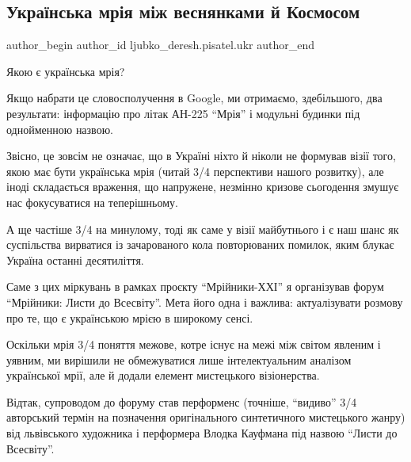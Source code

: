  
 
 
 
 
 
\subsection{Українська мрія між веснянками й Космосом}
\label{sec:01_11_2021.stz.news.ua.pravda.1.ukr_mria}
 
\ifcmt
 author_begin
   author_id ljubko_deresh.pisatel.ukr
 author_end
\fi

\begin{zznagolos}
Якою є українська мрія? 

Якщо набрати це словосполучення в Google, ми отримаємо, здебільшого, два
результати: інформацію про літак АН-225 \enquote{Мрія} і модульні будинки під
однойменною назвою. 

Звісно, це зовсім не означає, що в Україні ніхто й ніколи не формував візії
того, якою має бути українська мрія (читай 3/4 перспективи нашого розвитку), але
іноді складається враження, що напружене, незмінно кризове сьогодення змушує
нас фокусуватися на теперішньому.
\end{zznagolos}

А ще частіше 3/4 на минулому, тоді як саме у візії майбутнього і є наш шанс як
суспільства вирватися із зачарованого кола повторюваних помилок, яким блукає
Україна останні десятиліття.

Саме з цих міркувань в рамках проєкту \enquote{Мрійники-ХХІ} я організував форум
\enquote{Мрійники: Листи до Всесвіту}. Мета його одна і важлива: актуалізувати розмову
про те, що є українською мрією в широкому сенсі. 

Оскільки мрія 3/4 поняття межове, котре існує на межі між світом явленим і
уявним, ми вирішили не обмежуватися лише інтелектуальним аналізом української
мрії, але й додали елемент мистецького візіонерства. 

Відтак, супроводом до форуму став перформенс (точніше, \enquote{видиво} 3/4 авторський
термін на позначення оригінального синтетичного мистецького жанру) від
львівського художника і перформера Влодка Кауфмана під назвою \enquote{Листи до
Всесвіту}. 
 
